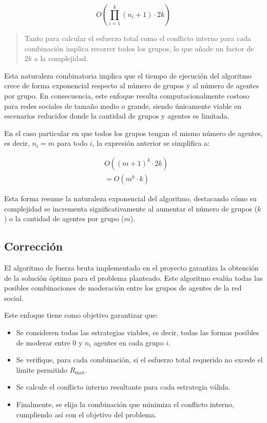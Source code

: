 \begin{equation}
	O \left( \prod_{ i = 1 }^k (n_i + 1) \cdot 2 k \right)
\end{equation}

\begin{quote}
	Tanto para calcular el esfuerzo total como el conflicto interno para cada combinación implica recorrer todos los grupos, lo que añade un factor de $2 k$ a la complejidad.
\end{quote}

Esta naturaleza combinatoria implica que el tiempo de ejecución del algoritmo crece de forma exponencial respecto al número de grupos y al número de agentes por grupo. En consecuencia, este enfoque resulta computacionalmente costoso para redes sociales de tamaño medio o grande, siendo únicamente viable en escenarios reducidos donde la cantidad de grupos y agentes es limitada.

En el caso particular en que todos los grupos tengan el mismo número de agentes, es decir, $n_i = m$ para todo $i$, la expresión anterior se simplifica a:

\begin{align}
	& O \left((m + 1)^k \cdot 2 k \right ) \\
	& = O(m^k \cdot k)
\end{align}

Esta forma resume la naturaleza exponencial del algoritmo, destacando cómo su complejidad se incrementa significativamente al aumentar el número de grupos ($k$) o la cantidad de agentes por grupo ($m$).

\subsection{Corrección}

El algoritmo de fuerza bruta implementado en el proyecto garantiza la obtención de la solución óptima para el problema planteado. Este algoritmo evalúa todas las posibles combinaciones de moderación entre los grupos de agentes de la red social.

Este enfoque tiene como objetivo garantizar que:

\begin{itemize}
	\item Se consideren todas las estrategias viables, es decir, todas las formas posibles de moderar entre $0$ y $n_i$ agentes en cada grupo $i$.

	\item Se verifique, para cada combinación, si el esfuerzo total requerido no excede el límite permitido $R_{ \max }$.

	\item Se calcule el conflicto interno resultante para cada estrategia válida.

	\item Finalmente, se elija la combinación que minimiza el conflicto interno, cumpliendo así con el objetivo del problema.
\end{itemize}

